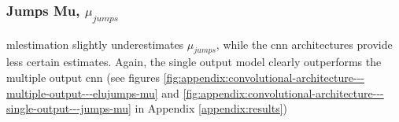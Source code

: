 \documentclass[11pt,oneside,openany,a4paper,english, report, goldenblock
]{usthesis}
\begin{document}
\subsubsection{Jumps Mu, $\mu_{jumps}$}
\acrshort{mlestimation} slightly underestimates $\mu_{jumps}$, while the \acrshort{cnn} architectures provide less certain estimates. Again, the single output model clearly outperforms the multiple output \acrshort{cnn} (see figures \ref{fig:appendix:convolutional-architecture---multiple-output---elujumps-mu} and \ref{fig:appendix:convolutional-architecture---single-output---jumps-mu} in Appendix \ref{appendix:results})

\begin{figure}[h]
\end{figure}
\end{document}
